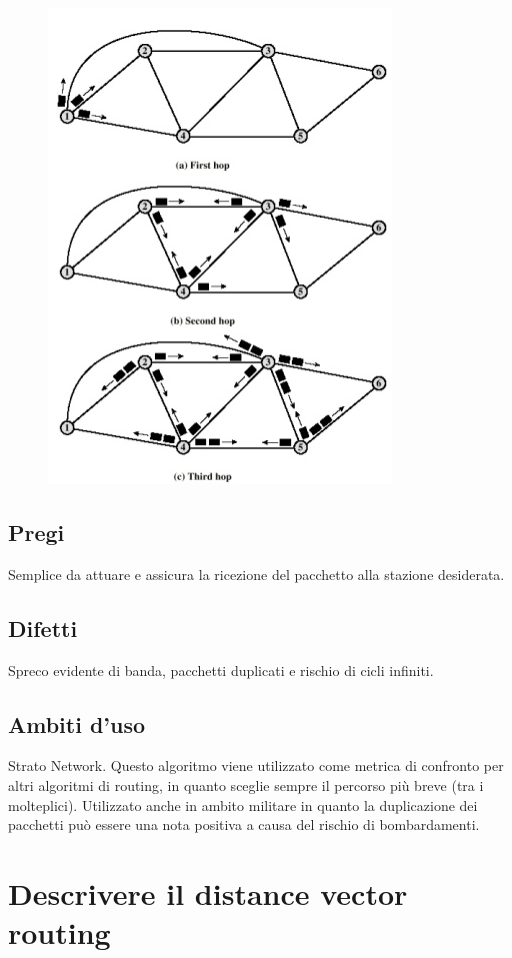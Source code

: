 \begin{figure}[H]
\centering
\includegraphics[scale=0.7]{res/img/32_Flooding.png}
\end{figure}

\subsection{Pregi}
Semplice da attuare e assicura la ricezione del pacchetto alla stazione desiderata.

\subsection{Difetti}
Spreco evidente di banda, pacchetti duplicati e rischio di cicli infiniti.

\subsection{Ambiti d'uso}
Strato Network.
Questo algoritmo viene utilizzato come metrica di confronto per altri algoritmi di routing, in quanto sceglie sempre il percorso più breve (tra i molteplici).
Utilizzato anche in ambito militare in quanto la duplicazione dei pacchetti può essere una nota positiva a causa del rischio di bombardamenti.

\section{Descrivere il distance vector routing}

